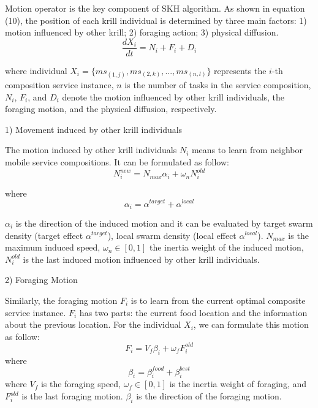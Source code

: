 \documentclass[10pt,journal,compsoc]{IEEEtran}
\begin{document}
Motion operator is the key component of SKH algorithm. As shown in equation (10), the position of each krill individual is determined by three main factors: 1) motion influenced by other krill; 2) foraging action; 3) physical diffusion. 
\begin{equation}
\frac{dX_i}{dt} =N_i+F_i+D_i
\end{equation}

where individual $X_i = \{ms_{(1,j)}, ms_{(2,k)}, . . . , ms_{(n,l)}\}$ represents the $i$-th composition service instance, $n$ is the number of tasks in the service composition, $N_i$, $F_i$, and $D_i$ denote the motion influenced by other krill individuals, the foraging motion, and the physical diffusion, respectively.

1) Movement induced by other krill individuals

The motion induced by other krill individuals $N_i$ means to learn from neighbor mobile service compositions. It can be formulated as follow:
\begin{equation}
N^{new}_i = N_{max}\alpha_i + \omega_n N^{old}_i
\end{equation}

where
\begin{equation}
\alpha_i = \alpha^{target} + \alpha^{local}
\end{equation}

$\alpha_i$ is the direction of the induced motion and it can be evaluated by target swarm density (target effect $\alpha^{target}$), local swarm density (local effect $\alpha^{local}$). $N_{max}$ is the maximum induced speed, $\omega_n \in [0, 1]$ the inertia weight of the induced motion, $N^{old}_{i}$ is the last induced motion influenced by other krill individuals.

2) Foraging Motion

Similarly, the foraging motion $F_i$ is to learn from the current optimal composite service instance. 
$F_i$ has two parts: the current food location and the information about the previous location. 
For the individual $X_i$, we can formulate this motion as follow:
\begin{equation}
F_i = V_f\beta_i + \omega_f F^{old}_i
\end{equation}
where
\begin{equation}
\beta_i = \beta_i^{food}+\beta_i^{best}
\end{equation}
where $V_f$ is the foraging speed, $\omega_f \in [0, 1]$ is the inertia weight of foraging, and $F^{old}_i$ is the last foraging motion. $\beta_i$ is the direction of the foraging motion.
\end{document}
